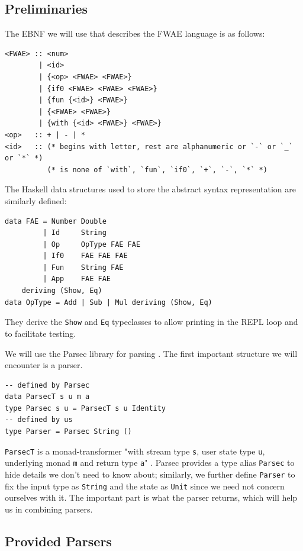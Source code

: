 \documentclass[format=acmlarge, review=false, nonacm=false, screen=true]{acmart}
\begin{document}
\subsection{Preliminaries}
The EBNF we will use that describes the FWAE language is as follows:

\begin{verbatim}
<FWAE> :: <num>
        | <id>
        | {<op> <FWAE> <FWAE>}
        | {if0 <FWAE> <FWAE> <FWAE>}
        | {fun {<id>} <FWAE>}
        | {<FWAE> <FWAE>}
        | {with {<id> <FWAE>} <FWAE>}
<op>   :: + | - | *
<id>   :: (* begins with letter, rest are alphanumeric or `-` or `_` or `*` *)
          (* is none of `with`, `fun`, `if0`, `+`, `-`, `*` *)
\end{verbatim}

The Haskell data structures used to store the abstract syntax representation are similarly defined:

\begin{verbatim}
data FAE = Number Double
         | Id     String
         | Op     OpType FAE FAE
         | If0    FAE FAE FAE
         | Fun    String FAE
         | App    FAE FAE
    deriving (Show, Eq)
data OpType = Add | Sub | Mul deriving (Show, Eq)
\end{verbatim}

They derive the \texttt{Show} and \texttt{Eq} typeclasses to allow printing in the REPL loop and to facilitate testing.

We will use the Parsec library for parsing \cite{parsec}. The first important structure we will encounter is a parser.

\begin{verbatim}
-- defined by Parsec
data ParsecT s u m a
type Parsec s u = ParsecT s u Identity
-- defined by us
type Parser = Parsec String ()
\end{verbatim}

\texttt{ParsecT} is a monad-transformer "with stream type \texttt{s}, user state type \texttt{u}, underlying monad \texttt{m} and return type \texttt{a}" \cite{parsec-hackage}. Parsec provides a type alias \texttt{Parsec} to hide details we don't need to know about; similarly, we further define \texttt{Parser} to fix the input type as \texttt{String} and the state as \texttt{Unit} since we need not concern ourselves with it. The important part is what the parser returns, which will help us in combining parsers.

\subsection{Provided Parsers}
\end{document}
